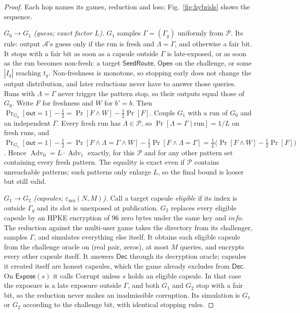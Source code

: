 \documentclass[pdflatex,sn-mathphys-num]{sn-jnl}%
\theoremstyle{plain}
\theoremstyle{definition}
\newcommand{\Adv}{\operatorname{Adv}}
\begin{document}
\begin{proof}
Each hop names its games, reduction and loss; Fig.~\ref{fig:hybrids} shows the sequence.

\emph{$G_0\to G_1$ (guess; exact factor $L$).} $G_1$ samples $\Gamma=(\Gamma_g)$ uniformly from $\mathcal P$. Its rule: output $\mathcal A$'s guess only if the run is fresh and $\Lambda=\Gamma$, and otherwise a fair bit. It stops with a fair bit as soon as a capsule outside $\Gamma$ is late-exposed, or as soon as the run becomes non-fresh: a target $\mathsf{SeedRoute}$, $\mathsf{Open}$ on the challenge, or some $|I_g|$ reaching $t_g$. Non-freshness is monotone, so stopping early does not change the output distribution, and later reductions never have to answer those queries. Runs with $\Lambda=\Gamma$ never trigger the pattern stop, so their outputs equal those of $G_0$. Write $F$ for freshness and $W$ for $b'=b$. Then $\Pr_{G_0}[\mathsf{out}=1]-\tfrac12=\Pr[F\wedge W]-\tfrac12\Pr[F]$. Couple $G_1$ with a run of $G_0$ and an independent $\Gamma$. Every fresh run has $\Lambda\in\mathcal P$, so $\Pr[\Lambda=\Gamma\mid\text{run}]=1/L$ on fresh runs, and
$\Pr_{G_1}[\mathsf{out}=1]-\tfrac12=\Pr[F\wedge\Lambda{=}\Gamma\wedge W]-\tfrac12\Pr[F\wedge\Lambda{=}\Gamma]=\tfrac1L\big(\Pr[F\wedge W]-\tfrac12\Pr[F]\big)$.
Hence $\Adv_0=L\cdot\Adv_1$ exactly, for this $\mathcal P$ and for any other pattern set containing every fresh pattern. The equality is exact even if $\mathcal P$ contains unreachable patterns; such patterns only enlarge $L$, so the final bound is looser but still valid.

\emph{$G_1\to G_2$ (capsules; $\varepsilon_{\mathrm{mu}}(N,M)$).} Call a target capsule \emph{eligible} if its index is outside $\Gamma_g$ and its slot is unexposed at publication. $G_2$ replaces every eligible capsule by an HPKE encryption of 96 zero bytes under the same key and $\mathit{info}$. The reduction against the multi-user game takes the directory from its challenger, samples $\Gamma$, and simulates everything else itself. It obtains each eligible capsule from the challenge oracle on (real pair, zeros), at most $M$ queries, and encrypts every other capsule itself. It answers $\mathsf{Dec}$ through its decryption oracle; capsules it created itself are honest capsules, which the game already excludes from $\mathsf{Dec}$. On $\mathsf{Expose}(s)$ it calls Corrupt unless $s$ holds an eligible capsule. In that case the exposure is a late exposure outside $\Gamma$, and both $G_1$ and $G_2$ stop with a fair bit, so the reduction never makes an inadmissible corruption. Its simulation is $G_1$ or $G_2$ according to the challenge bit, with identical stopping rules.


\end{proof}
\end{document}
